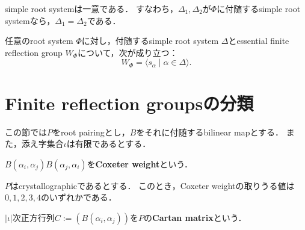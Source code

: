 \begin{theorem}
  \label{thm:RootPairing.unique_SimpleRootSystem}
  simple root systemは一意である．
  すなわち，$\Delta_1, \Delta_2$が$\Phi$に付随するsimple root systemなら，$\Delta_1 = \Delta_2$である．
\end{theorem}

\begin{theorem}
  \label{thm:RootPairing.FRG_gen_by_SimpleRootSystem}
  任意のroot system $\Phi$に対し，付随するsimple root system $\Delta$とessential finite reflection group $W_\Phi$について，次が成り立つ：
  \begin{equation}
    W_\Phi = \langle s_\alpha \mid \alpha \in \Delta \rangle.
  \end{equation}
\end{theorem}

\newpage
\section{Finite reflection groupsの分類}
この節では$P$をroot pairingとし，$B$をそれに付随するbilinear mapとする．
また，添え字集合$\iota$は有限であるとする．
\begin{definition}
  \label{defi:RootPairing.coxeterWeightIn}
  \leanok
  $B(\alpha_i, \alpha_j) B(\alpha_j, \alpha_i)$を\textbf{Coxeter weight}という．
\end{definition}

\begin{lemma}
  \label{lem:RootPairing.coxeterWeightIn_mem_set_of_isCrystallographic}
  \leanok
  $P$はcrystallographicであるとする．
  このとき，Coxeter weightの取りうる値は$0, 1, 2, 3, 4$のいずれかである．
\end{lemma}

\begin{definition}
  \label{defi:RootPairing.Base.cartanMatrixIn}
  \leanok
  $|\iota|$次正方行列$C := (B(\alpha_i, \alpha_j))$を$P$の\textbf{Cartan matrix}という．
\end{definition}

